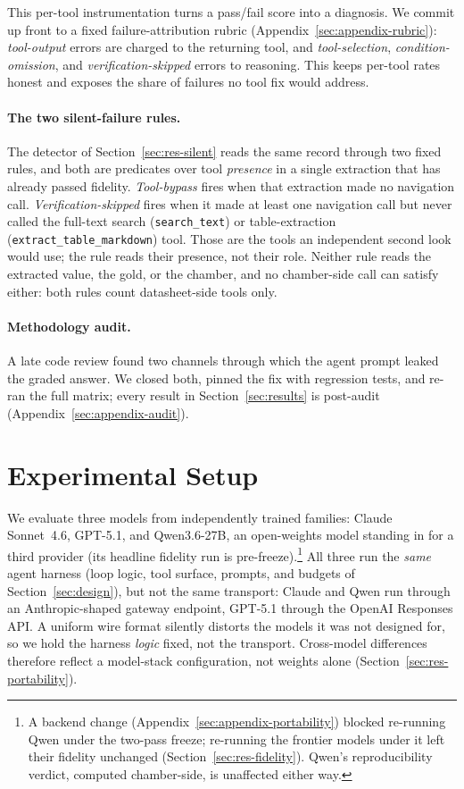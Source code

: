 \documentclass[11pt]{article}
\begin{document}
This per-tool instrumentation turns a pass/fail score into a diagnosis.
We commit up front to a fixed failure-attribution rubric
(Appendix~\ref{sec:appendix-rubric}): \emph{tool-output} errors are
charged to the returning tool, and \emph{tool-selection},
\emph{condition-omission}, and \emph{verification-skipped} errors to
reasoning. This keeps per-tool rates honest and exposes the share of
failures no tool fix would address.

\paragraph{The two silent-failure rules.}
The detector of Section~\ref{sec:res-silent} reads the same record
through two fixed rules, and both are predicates over tool
\emph{presence} in a single extraction that has already passed fidelity.
\emph{Tool-bypass} fires when that extraction made no navigation call.
\emph{Verification-skipped} fires when it made at least one navigation
call but never called the full-text search (\texttt{search\_text}) or
table-extraction (\texttt{extract\_table\_markdown}) tool. Those are the
tools an independent second look would use; the rule reads their
presence, not their role. Neither
rule reads the extracted value, the gold, or the chamber, and no
chamber-side call can satisfy either: both rules count datasheet-side
tools only.

\paragraph{Methodology audit.}
A late code review found two channels through which the agent prompt
leaked the graded answer. We closed both, pinned the fix with
regression tests, and re-ran the full matrix; every result in
Section~\ref{sec:results} is post-audit (Appendix~\ref{sec:appendix-audit}).

\section{Experimental Setup}
\label{sec:setup}

We evaluate three models from independently trained families: Claude
Sonnet~4.6, GPT-5.1, and Qwen3.6-27B, an open-weights model standing in
for a third provider (its headline fidelity run is
pre-freeze).\footnote{A backend change
(Appendix~\ref{sec:appendix-portability}) blocked re-running Qwen under
the two-pass freeze; re-running the frontier models under it left their
fidelity unchanged (Section~\ref{sec:res-fidelity}). Qwen's
reproducibility verdict, computed chamber-side, is unaffected either
way.} All
three run the \emph{same} agent harness (loop logic, tool surface,
prompts, and budgets of Section~\ref{sec:design}), but not the same
transport: Claude and Qwen run through an Anthropic-shaped gateway
endpoint, GPT-5.1 through the OpenAI Responses API. A uniform wire format
silently distorts the models it was not designed for, so we hold the
harness \emph{logic} fixed, not the transport. Cross-model differences
therefore reflect a model-stack configuration, not weights alone
(Section~\ref{sec:res-portability}).
\end{document}
